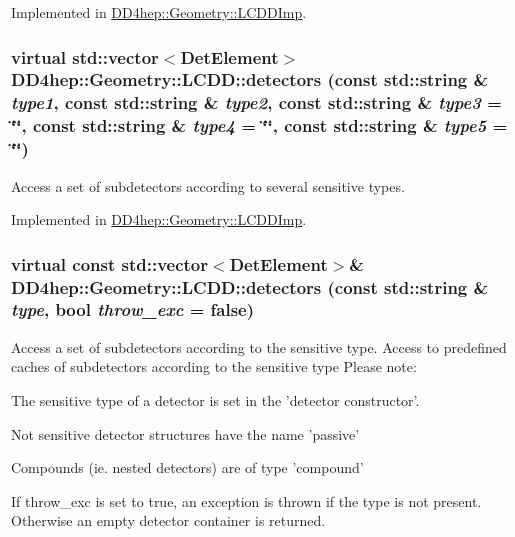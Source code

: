 Implemented in \hyperlink{class_d_d4hep_1_1_geometry_1_1_l_c_d_d_imp_ab46d786f0e67c07c818b2e022ddd6dc4}{DD4hep::Geometry::LCDDImp}.\hypertarget{class_d_d4hep_1_1_geometry_1_1_l_c_d_d_aee911f853a0e585f0ac9be7852ed6954}{
\subsubsection[{detectors}]{\setlength{\rightskip}{0pt plus 5cm}virtual std::vector$<${\bf DetElement}$>$ DD4hep::Geometry::LCDD::detectors (const std::string \& {\em type1}, \/  const std::string \& {\em type2}, \/  const std::string \& {\em type3} = {\ttfamily \char`\"{}\char`\"{}}, \/  const std::string \& {\em type4} = {\ttfamily \char`\"{}\char`\"{}}, \/  const std::string \& {\em type5} = {\ttfamily \char`\"{}\char`\"{}})}}
\label{class_d_d4hep_1_1_geometry_1_1_l_c_d_d_aee911f853a0e585f0ac9be7852ed6954}


Access a set of subdetectors according to several sensitive types. 

Implemented in \hyperlink{class_d_d4hep_1_1_geometry_1_1_l_c_d_d_imp_aa0b21c4dda1cce4ae1681f6b75b1b380}{DD4hep::Geometry::LCDDImp}.\hypertarget{class_d_d4hep_1_1_geometry_1_1_l_c_d_d_a0f8e72265d7c6fd7d0dcdd293e13031f}{
\subsubsection[{detectors}]{\setlength{\rightskip}{0pt plus 5cm}virtual const std::vector$<${\bf DetElement}$>$\& DD4hep::Geometry::LCDD::detectors (const std::string \& {\em type}, \/  bool {\em throw\_\-exc} = {\ttfamily false})}}
\label{class_d_d4hep_1_1_geometry_1_1_l_c_d_d_a0f8e72265d7c6fd7d0dcdd293e13031f}


Access a set of subdetectors according to the sensitive type. Access to predefined caches of subdetectors according to the sensitive type Please note:
\begin{DoxyItemize}
\item The sensitive type of a detector is set in the 'detector constructor'.
\item Not sensitive detector structures have the name 'passive'
\item Compounds (ie. nested detectors) are of type 'compound'
\item If throw\_\-exc is set to true, an exception is thrown if the type is not present. Otherwise an empty detector container is returned. 
\end{DoxyItemize}

